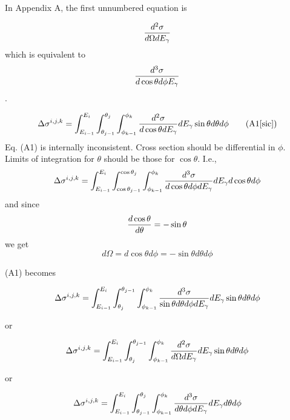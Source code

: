\documentclass{article}
\begin{document}
In Appendix A, the first unnumbered equation is

\begin{equation}
      {d^2\sigma \over d\Omega dE_\gamma}
\end{equation}
which is equivalent to 
\begin{equation}
      {d^3\sigma \over d\cos\theta d\phi E_\gamma}
\end{equation}.

\begin{equation}
  \Delta\sigma^{i,j,k} = \int^{E_i}_{E_{i-1}}\int^{\theta_j}_{\theta_{j-1}}\int^{\phi_k}_{\phi_{k-1}} {d^2\sigma \over d\cos\theta dE_\gamma}dE_\gamma \sin\theta d\theta d\phi
  \tag{A1[sic]}
\end{equation}
Eq. (A1) is internally inconsistent. Cross section should be differential in $\phi$. Limits of integration for $\theta$ should be those for $\cos\theta$. I.e.,
\begin{equation}\Delta\sigma^{i,j,k} = \int^{E_i}_{E_{i-1}}\int^{\cos\theta_j}_{\cos\theta_{j-1}}\int^{\phi_k}_{\phi_{k-1}} {d^3\sigma \over d\cos\theta d\phi dE_\gamma}dE_\gamma d\cos\theta d\phi\end{equation}
and since
\begin{equation}{d\cos\theta \over d\theta} = -\sin\theta\end{equation}
we get
\begin{equation} d\Omega = d\cos\theta d\phi = -\sin\theta d\theta d\phi \end{equation}

(A1) becomes

\begin{equation}\Delta\sigma^{i,j,k} = \int^{E_i}_{E_{i-1}}\int_{\theta_j}^{\theta_{j-1}}\int^{\phi_k}_{\phi_{k-1}} {d^3\sigma \over \sin\theta d\theta d\phi dE_\gamma} dE_\gamma \sin\theta d\theta d\phi\end{equation}

or

\begin{equation}\Delta\sigma^{i,j,k} = \int^{E_i}_{E_{i-1}}\int_{\theta_j}^{\theta_{j-1}}\int^{\phi_k}_{\phi_{k-1}} {d^2\sigma \over d\Omega dE_\gamma} dE_\gamma \sin\theta d\theta d\phi\end{equation}

or

\begin{equation}\Delta\sigma^{i,j,k} = \int^{E_i}_{E_{i-1}}\int_{\theta_{j-1}}^{\theta_j}\int^{\phi_k}_{\phi_{k-1}} {d^3\sigma \over d\theta d\phi dE_\gamma} dE_\gamma d\theta d\phi\end{equation}
\end{document}
